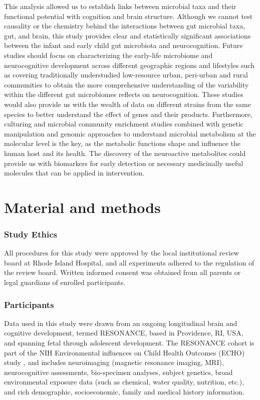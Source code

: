 \documentclass{article}
\begin{document}
This analysis allowed us to establish links between microbial taxa and
their functional potential with cognition and brain structure. Although
we cannot test causality or the chemistry behind the interactions
between gut microbial taxa, gut, and brain, this study provides clear
and statistically significant associations between the infant and early
child gut microbiota and neurocognition. Future studies should focus on
characterizing the early-life microbiome and neurocognitive development
across different geographic regions and lifestyles such as covering
traditionally understudied low-resource urban, peri-urban and rural
communities to obtain the more comprehensive understanding of the
variability within the different gut microbiomes reflects on
neurocognition. These studies would also provide us with the wealth of
data on different strains from the same species to better understand the
effect of genes and their products. Furthermore, culturing and microbial
community enrichment studies combined with genetic manipulation and
genomic approaches to understand microbial metabolism at the molecular
level is the key, as the metabolic functions shape and influence the
human host and its health. The discovery of the neuroactive metabolites
could provide us with biomarkers for early detection or necessary
medicinally useful molecules that can be applied in intervention.

\section*{Material and methods}

\subsubsection*{Study Ethics}

All procedures for this study were approved by the local institutional
review board at Rhode Island Hospital, and all experiments adhered to
the regulation of the review board. Written informed consent was
obtained from all parents or legal guardians of enrolled participants.

\subsubsection*{Participants}

Data used in this study were drawn from an ongoing longitudinal
brain and cognitive development, termed RESONANCE, based in Providence, RI, USA,
and spanning fetal through adolescent development. The
RESONANCE cohort is part of the NIH Environmental influences
on Child Health Outcomes (ECHO) study
\cite{forrestAdvancingScienceChildren2018,gillmanEnvironmentalInfluencesChild2018},
and includes neuroimaging (magnetic
resonance imaging, MRI), neurocognitive assessments, bio-specimen
analyses, subject genetics, broad environmental exposure data
(such as chemical, water quality, nutrition, etc.), and
rich demographic, socioeconomic, family and medical history information.
\end{document}

